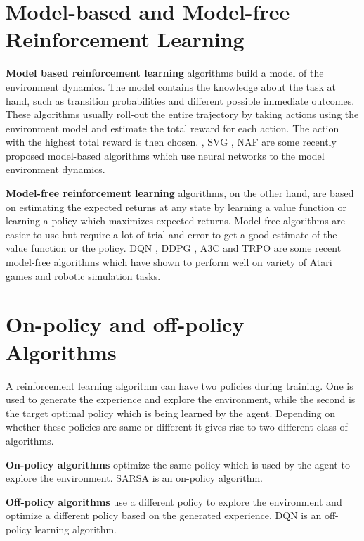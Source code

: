 \section{Model-based and Model-free Reinforcement Learning}
\textbf{Model based reinforcement learning} algorithms build a model of the environment dynamics. The model contains the knowledge about the task at hand, such as transition probabilities and different possible immediate outcomes. These algorithms usually roll-out the entire trajectory by taking actions using the environment model and estimate the total reward for each action. The action with the highest total reward is then chosen. \cite{Nagabandi2017NeuralND}, SVG \cite{svg}, NAF \cite{gu2016} are some recently proposed model-based algorithms which use neural networks to the model environment dynamics.
\linebreak

\noindent
\textbf{Model-free reinforcement learning} algorithms, on the other hand, are based on estimating the expected returns at any state by learning a value function or learning a policy which maximizes expected returns. Model-free algorithms are easier to use but require a lot of trial and error to get a good estimate of the value function or the policy. DQN \cite{01_dqn}, DDPG \cite{ddpg}, A3C \cite{a3c} and TRPO \cite{schulman2015trust} are some recent model-free algorithms which have shown to perform well on variety of Atari games and robotic simulation tasks.

\section{On-policy and off-policy Algorithms}
A reinforcement learning algorithm can have two policies during training. One is used to generate the experience and explore the environment, while the second is the target optimal policy which is being learned by the agent. Depending on whether these policies are same or different it gives rise to two different class of algorithms. 

\textbf{On-policy algorithms} optimize the same policy which is used by the agent to explore the environment. SARSA \cite{sutton1998reinforcement} is an on-policy algorithm.

\textbf{Off-policy algorithms} use a different policy to explore the environment and optimize a different policy based on the generated experience. DQN is an off-policy learning algorithm.

